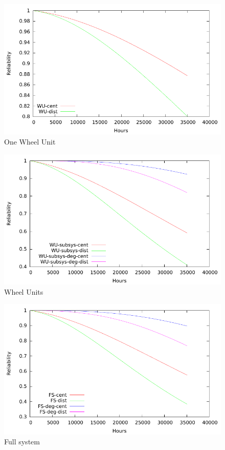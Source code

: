 \begin{figure}[H]
  \centering
  \includegraphics{plots/WU.pdf}
  \caption{One Wheel Unit}
  \label{fig:wu}
\end{figure}
\begin{figure}[H]
  \centering
  \includegraphics{plots/WUs.pdf}
  \caption{Wheel Units}
  \label{fig:wus}
\end{figure}
\begin{figure}[H]
  \centering
  \includegraphics{plots/FS.pdf}
  \caption{Full system}
  \label{fig:fs}
\end{figure}
